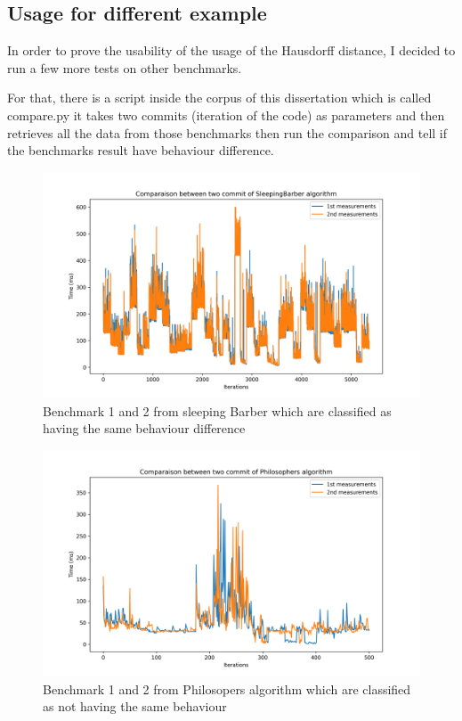 \documentclass{article}
\begin{document}
\subsection{Usage for different example}


In order to prove the usability of the usage of the Hausdorff distance, I decided to run a few more tests on other benchmarks.

For that, there is a script inside the corpus of this dissertation which is called compare.py it takes two commits (iteration of the code) as parameters and then retrieves all the data from those benchmarks then run the comparison and tell if the benchmarks result have behaviour difference. \\

\begin{figure}[]
    \centering
    \includegraphics[width=1\textwidth]{images/plot_SleepingBarber_4.069999999999936.png}
    \caption{Benchmark 1 and 2 from sleeping Barber which are classified as having the same behaviour difference}
    \label{fig:bench_1_2_1}
\end{figure}

\begin{figure}[]
    \centering
    \includegraphics[width=1\textwidth]{images/plot_Philosophers_42.533000000000015.png}
    \caption{Benchmark 1 and 2 from Philosopers algorithm which are classified as not having the same behaviour}
    \label{fig:bench_1_2_2}
\end{figure}
\end{document}
